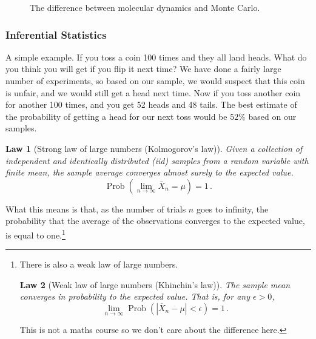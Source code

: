 \documentclass{article}
\theoremstyle{plain}\theoremheaderfont{\normalfont\itshape}\theorembodyfont{\rmfamily}\theoremseparator{.}\newtheorem*{rem}{Remark}\newtheorem*{ex}{Example}\newtheorem*{proof}{Proof}\newtheorem*{altp}{Alternative proof}
\theoremstyle{plain}\theoremheaderfont{\normalfont\bfseries}\theorembodyfont{\rmfamily}\theoremseparator{.}\newtheorem{thm}{Theorem}[section]\newtheorem{lem}[thm]{Lemma}\newtheorem{prop}[thm]{Proposition}\newtheorem*{cor}{Corollary}\newtheorem{defn}[thm]{Definition}\newtheorem{clm}[thm]{Claim}\newtheorem{clminproof}{Claim}\newtheorem{alg}[thm]{Algorithm}\newtheorem{hyp}[thm]{Hypothesis}\newtheorem{law}[thm]{Law}
\theoremstyle{break}\theoremheaderfont{\normalfont\itshape}\theorembodyfont{\rmfamily}\theoremseparator{.\medskip}\newtheorem*{proofskip}{Proof}\newtheorem*{exs}{Examples}\newtheorem*{rems}{Remarks}
\theoremstyle{break}\theoremheaderfont{\normalfont\bfseries}\theorembodyfont{\rmfamily}\theoremseparator{.\medskip}\newtheorem{lemskip}[thm]{Lemma}\newtheorem{defnskip}[thm]{Definition}\newtheorem{propskip}[thm]{Proposition}\newtheorem{thmskip}[thm]{Theorem}
\numberwithin{equation}{section}
\newcommand{\abs}[1]{\left| #1 \right|}
\DeclareMathOperator{\Prob}{Prob}
\begin{document}
\begin{figure}
        \caption{The difference between molecular dynamics and Monte Carlo.}
    \end{figure}

    \subsubsection{Inferential Statistics}
    A simple example. If you toss a coin 100 times and they all land heads. What do you think you will get if you flip it next time? We have done a fairly large number of experiments, so based on our sample, we would suspect that this coin is unfair, and we would still get a head next time. Now if you toss another coin for another 100 times, and you get 52 heads and 48 tails. The best estimate of the probability of getting a head for our next toss would be \(52\%\) based on our samples.

    \begin{law}[Strong law of large numbers (Kolmogorov's law)]
        Given a collection of independent and identically distributed (iid) samples from a random variable with finite mean, the sample average converges almost surely to the expected value.
        \begin{equation}
            \Prob\left(\lim_{n\to\infty}\overline{X}_n=\mu\right)=1\,.
        \end{equation}
    \end{law}
    What this means is that, as the number of trials \(n\) goes to infinity, the probability that the average of the observations converges to the expected value, is equal to one.\footnote{There is also a weak law of large numbers.
    \begin{law}[Weak law of large numbers (Khinchin's law)]
        The sample mean converges in probability to the expected value. That is, for any \(\epsilon>0\),
        \begin{equation}
            \lim_{n\to\infty}\Prob(\abs{\overline{X}_n-\mu}<\epsilon)=1\,.
        \end{equation}
    \end{law}
    This is not a maths course so we don't care about the difference here.}
\end{document}
